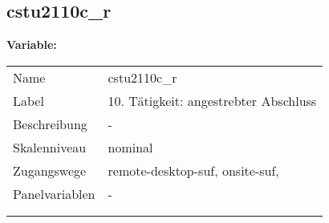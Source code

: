 	
	
	\subsection{cstu2110c\_r}
	\label{subSection:cstu2110c_r}

	\noindent\textbf{Variable:}\\
		\begin{tabular}{lL{11.3cm}}
			\label{tableVariable:cstu2110c_r}
			Name & cstu2110c\_r \\
			Label & 10. Tätigkeit: angestrebter Abschluss \\
			Beschreibung & - \\
			Skalenniveau & nominal \\
			Zugangswege &
				remote-desktop-suf,
				onsite-suf,
 \\
			Panelvariablen & -
			 \\
			 \\
 \\
		\end{tabular}






